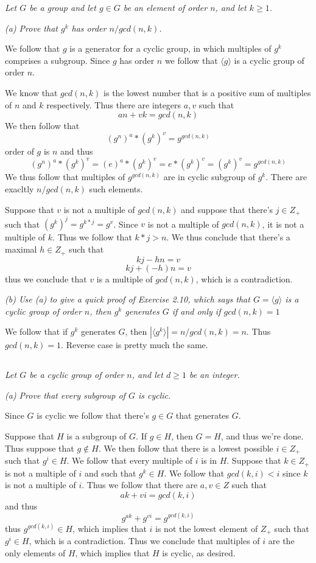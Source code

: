 \documentclass[11pt,oneside,titlepage]{book}
\newcommand{\eangle}[1]{\langle #1 \rangle}
\begin{document}
\textit{Let $G$ be a group and let $g \in G$ be an element of order
  $n$, and let $k \geq 1$.}

\textit{(a) Prove that $g^k$ has order $n / gcd(n, k)$.}

We follow that $g$ is a generator for a cyclic group, in which
multiples of $g^k$ comprises a subgroup. Since $g$ has order $n$ we
follow that $\eangle{g}$ is a cyclic group of order $n$.

We know that $gcd(n, k)$ is the lowest number that is a positive sum
of multiples of $n$ and $k$ respectively. Thus there are integers
$a, v$ such that
$$an + vk = gcd(n, k)$$
We then follow that
$$(g^n)^a * (g^k)^v = g^{gcd(n, k)}$$
order of $g$ is $n$ and thus
$$(g^n)^a * (g^k)^v = (e)^a * (g^k)^v = e * (g^k)^v = (g^k)^v = g^{gcd(n, k)}$$
We thus follow that multiples of $g^{gcd(n, k)}$ are in cyclic
subgroup of $g^k$. There are exacltly $n / gcd(n, k)$ such elements.

Suppose that $v$ is not a multiple of $gcd(n, k)$ and suppose that
there's $j \in Z_+$ such that $(g^k)^j = g^{k * j} = g^v$. Since $v$ is
not a multiple of $gcd(n, k)$, it is not a multiple of $k$. Thus we
follow that $k * j > n$. We thus conclude that there's a maximal $h \in Z_+$
such that
$$kj - hn = v$$
$$kj + (-h)n = v$$
thus we conclude that $v$ is a multiple of $gcd(n, k)$, which is a
contradiction.

\textit{(b) Use (a) to give a quick proof of Exercise 2.10, which says
  that $G = \eangle{g}$ is a cyclic group of order $n$, then $g^k$
  generates $G$ if and only if $gcd(n, k) = 1$ }

We follow that if $g^k$ generates $G$, then $|\eangle{g^k}| = n / gcd(n,
k) = n$. Thus $gcd(n, k) = 1$. Reverse case is pretty much the same.

\subsection{}

\textit{Let $G$ be a cyclic group of order $n$, and let $d \geq 1$ be
  an integer.}

\textit{(a) Prove that every subgroup of $G$ is cyclic.}

Since $G$ is cyclic we follow that there's $g \in G$ that generates
$G$.

Suppose that $H$ is a subgroup of $G$. If $g \in H$, then $G = H$, and
thus we're done. Thus suppose that $g \notin H$. We then follow that
there is a lowest possible $i \in Z_+$ such that $g^i \in H$. We
follow that every multiple of $i$ is in $H$. Suppose that $k \in Z_+$
is not a multiple of $i$ and such that $g^k \in H$. We follow that
$gcd(k, i) < i$ since $k$ is not a multiple of $i$. Thus we follow
that there are $a, v \in Z$ such that
$$ak + vi = gcd(k, i)$$
and thus
$$g^{ak} + g^{vi} = g^{gcd(k, i)}$$
thus $g^{gcd(k, i)} \in H$, which implies that $i$ is not the lowest element
of $Z_+$ such that $g^i \in H$, which is a contradiction. Thus we
conclude that multiples of $i$ are the only elements of $H$, which implies that
$H$ is cyclic, as desired.
\end{document}
